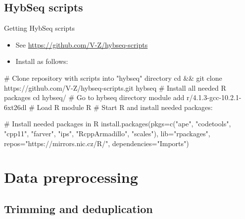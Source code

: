 \documentclass[compress,  xelatex, 11pt, xcolor=x11names, aspectratio=169,
	hyperref={
		bookmarks=true,
		unicode=true,
		colorlinks=true,
		pdftitle={HybSeq course},
		plainpages=false,
		pdfauthor={Vojtech Zeisek},
		pdfsubject={Practical processing of HybSeq target enrichment sequencing data on computing grids like MetaCentrum},
		pdfcreator={XeLaTeX},
		pdfkeywords={BASH, command line, GNU, HybSeq, Linux, MetaCentrum, sequencing shell, target enrichment},
		linkcolor=Turquoise4, %
		anchorcolor=DodgerBlue4, %
		citecolor=DodgerBlue4, %
		filecolor=DodgerBlue4, %
		menucolor=Tan4, %
		urlcolor=DarkOliveGreen4 %
		},
	url={hyphens, lowtilde} %
	]{beamer}
\begin{document}
\subsection{HybSeq scripts}

\begin{frame}[fragile]{Getting HybSeq scripts}
	\begin{itemize}
		\item See \url{https://github.com/V-Z/hybseq-scripts}
		\item Install as follows:
	\end{itemize}
	\begin{bashcode}
    # Clone repository with scripts into "hybseq" directory
    cd && git clone https://github.com/V-Z/hybseq-scripts.git hybseq
    # Install all needed R packages
    cd hybseq/ # Go to hybseq directory
    module add r/4.1.3-gcc-10.2.1-6xt26dl # Load R module
    R # Start R and install needed packages:
	\end{bashcode}
	\begin{spluscode}
    # Install needed packages in R
    install.packages(pkgs=c("ape", "codetools", "cpp11", "farver",
      "ips", "RcppArmadillo", "scales"), lib="rpackages",
      repos="https://mirrors.nic.cz/R/", dependencies="Imports")
	\end{spluscode}
\end{frame}

\section{Data preprocessing}

\subsection{Trimming and deduplication}
\end{document}
